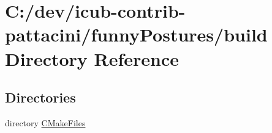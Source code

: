 \section{C\+:/dev/icub-\/contrib-\/pattacini/funny\+Postures/build Directory Reference}
\label{dir_58dad6826832034288aa5ff5045d2260}
\subsection*{Directories}
\begin{DoxyCompactItemize}
\item 
directory \hyperlink{dir_e149582ee98e04bdae7b6393a1884d08}{C\+Make\+Files}
\end{DoxyCompactItemize}
